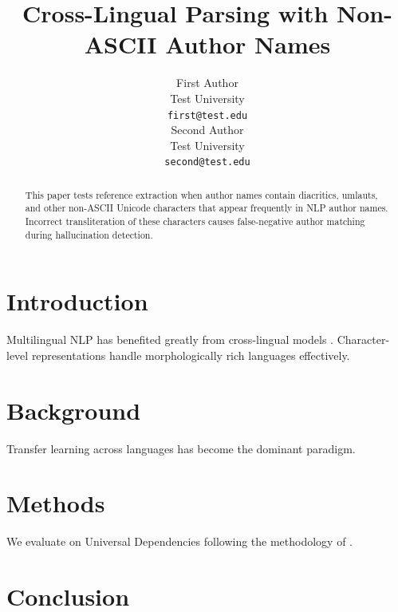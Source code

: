 \documentclass[11pt]{article}
\title{Cross-Lingual Parsing with Non-ASCII Author Names}
\author{First Author \\
  Test University \\
  \texttt{first@test.edu} \\\And
  Second Author \\
  Test University \\
  \texttt{second@test.edu} \\}
\begin{document}
\maketitle

\begin{abstract}
This paper tests reference extraction when author names contain diacritics,
umlauts, and other non-ASCII Unicode characters that appear frequently in
NLP author names. Incorrect transliteration of these characters causes
false-negative author matching during hallucination detection.
\end{abstract}

\section{Introduction}
\lipsum[1-2]
Multilingual NLP has benefited greatly from cross-lingual models
\cite{schuetze-1992-dimensions,sogaard-2011-semisupervised,nivre-etal-2016-universal}.
Character-level representations \cite{bojanowski-etal-2017-enriching} handle
morphologically rich languages effectively.

\lipsum[3-4]

\section{Background}
\lipsum[5-7]
Transfer learning across languages \cite{conneau-etal-2020-unsupervised,wu-dredze-2019-beto}
has become the dominant paradigm.

\lipsum[8-9]

\section{Methods}
\lipsum[10-12]
We evaluate on Universal Dependencies \cite{nivre-etal-2016-universal}
following the methodology of \cite{sogaard-2011-semisupervised}.

\lipsum[13-14]

\section{Conclusion}
\lipsum[15]



\end{document}
